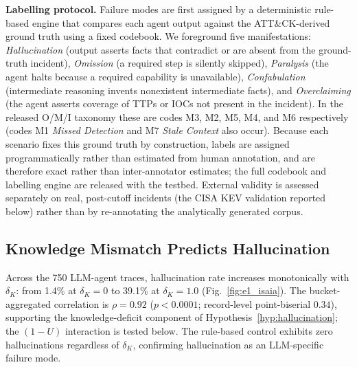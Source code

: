 \textbf{Labelling protocol.} Failure modes are first assigned by a
deterministic rule-based engine that compares each agent output against
the ATT\&CK-derived ground truth using a fixed codebook. We foreground
five manifestations: \textit{Hallucination} (output asserts facts that
contradict or are absent from the ground-truth incident),
\textit{Omission} (a required step is silently skipped),
\textit{Paralysis} (the agent halts because a required capability is
unavailable), \textit{Confabulation} (intermediate reasoning invents
nonexistent intermediate facts), and \textit{Overclaiming} (the agent
asserts coverage of TTPs or IOCs not present in the incident). In the
released O/M/I taxonomy these are codes M3, M2, M5, M4, and M6
respectively (codes M1 \textit{Missed Detection} and M7 \textit{Stale
Context} also occur). Because
each scenario fixes this ground truth by construction, labels are
assigned programmatically rather than estimated from human annotation,
and are therefore exact rather than inter-annotator estimates; the full
codebook and labelling engine are released with the testbed. External
validity is assessed separately on real, post-cutoff incidents (the
CISA KEV validation reported below) rather than by re-annotating the
analytically generated corpus.

\subsection{Knowledge Mismatch Predicts Hallucination}

Across the 750 LLM-agent traces, hallucination rate increases
monotonically with $\delta_K$: from 1.4\% at $\delta_K = 0$ to 39.1\% at
$\delta_K = 1.0$ (Fig.~\ref{fig:e1_isaia}). The bucket-aggregated
correlation is $\rho = 0.92$ ($p < 0.0001$; record-level point-biserial
$0.34$), supporting the knowledge-deficit component of
Hypothesis~\ref{hyp:hallucination}; the $(1{-}U)$ interaction is tested
below. The rule-based control exhibits zero hallucinations regardless
of $\delta_K$, confirming hallucination as an LLM-specific failure mode.

